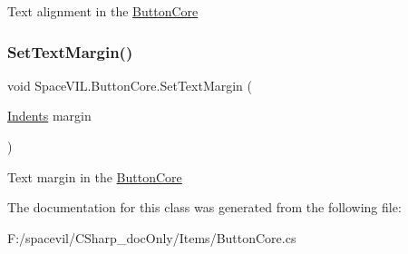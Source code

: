 Text alignment in the \mbox{\hyperlink{class_space_v_i_l_1_1_button_core}{Button\+Core}} 

\mbox{\label{class_space_v_i_l_1_1_button_core_ad1d215401ec59acf1c54cfa036606b0f}} 
\subsubsection{\texorpdfstring{Set\+Text\+Margin()}{SetTextMargin()}}
{\footnotesize\ttfamily void Space\+V\+I\+L.\+Button\+Core.\+Set\+Text\+Margin (\begin{DoxyParamCaption}\item[{\mbox{\hyperlink{struct_space_v_i_l_1_1_decorations_1_1_indents}{Indents}}}]{margin }\end{DoxyParamCaption})}



Text margin in the \mbox{\hyperlink{class_space_v_i_l_1_1_button_core}{Button\+Core}} 



The documentation for this class was generated from the following file\+:\begin{DoxyCompactItemize}
\item 
F\+:/spacevil/\+C\+Sharp\+\_\+doc\+Only/\+Items/Button\+Core.\+cs\end{DoxyCompactItemize}
